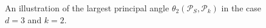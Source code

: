\documentclass[twoside,11pt]{book}
\newtheorem{definition}{Definition}
\numberwithin{theorem}{chapter}
\numberwithin{definition}{chapter}
\numberwithin{proposition}{chapter}
\numberwithin{corollary}{chapter}
\numberwithin{example}{chapter}
\numberwithin{lemma}{chapter}
\numberwithin{assumption}{chapter}
\numberwithin{equation}{chapter}
\numberwithin{figure}{chapter}
\DeclareMathOperator{\Det}{Det}
\DeclareMathOperator{\Prb}{\mathbb{P}}
\begin{document}

\begin{figure}[!ht]
  \centering
    
    \caption{An illustration of the largest principal angle $\theta_{2}(\mathcal{P}_{S}, \mathcal{P}_{k})$ in the case $d = 3$ and $k=2$.
    \label{f:cssp_principal_angles}
    }
\end{figure}
\end{document}
